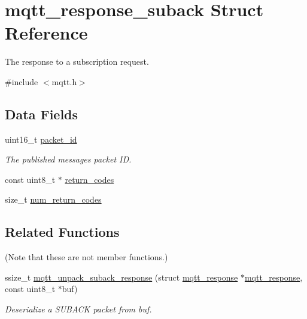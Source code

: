 \hypertarget{structmqtt__response__suback}{}\section{mqtt\+\_\+response\+\_\+suback Struct Reference}
\label{structmqtt__response__suback}


The response to a subscription request.  




{\ttfamily \#include $<$mqtt.\+h$>$}

\subsection*{Data Fields}
\begin{DoxyCompactItemize}
\item 
uint16\+\_\+t \hyperlink{structmqtt__response__suback_a459110242532bfeed856aedc144c3551}{packet\+\_\+id}\hypertarget{structmqtt__response__suback_a459110242532bfeed856aedc144c3551}{}\label{structmqtt__response__suback_a459110242532bfeed856aedc144c3551}

\begin{DoxyCompactList}\small\item\em The published messages packet ID. \end{DoxyCompactList}\item 
const uint8\+\_\+t $\ast$ \hyperlink{structmqtt__response__suback_aeb32e90e7c87e0d918c7cfad053d5720}{return\+\_\+codes}
\item 
size\+\_\+t \hyperlink{structmqtt__response__suback_a9040462add7b7e770f061fe089f3677a}{num\+\_\+return\+\_\+codes}
\end{DoxyCompactItemize}
\subsection*{Related Functions}
(Note that these are not member functions.) \begin{DoxyCompactItemize}
\item 
ssize\+\_\+t \hyperlink{structmqtt__response__suback_a52a9d997a2d4dbe6fd2abc6d458df908}{mqtt\+\_\+unpack\+\_\+suback\+\_\+response} (struct \hyperlink{structmqtt__response}{mqtt\+\_\+response} $\ast$\hyperlink{structmqtt__response}{mqtt\+\_\+response}, const uint8\+\_\+t $\ast$buf)
\begin{DoxyCompactList}\small\item\em Deserialize a S\+U\+B\+A\+CK packet from {\ttfamily buf}. \end{DoxyCompactList}\end{DoxyCompactItemize}


